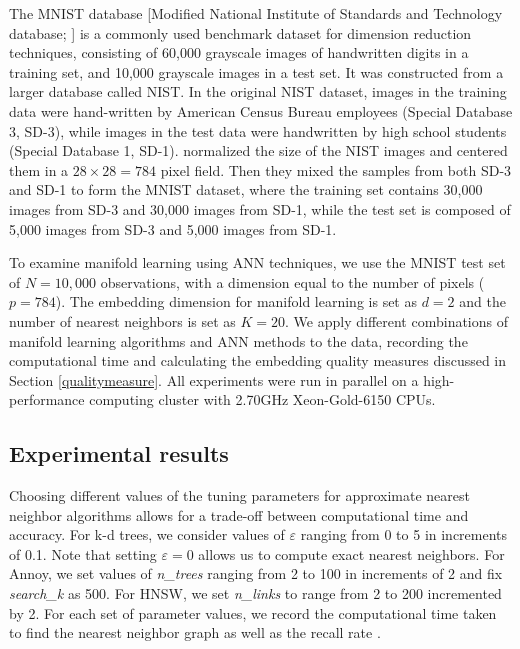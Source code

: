 \documentclass[11pt,a4paper,]{article}
\begin{document}
The MNIST database {[}Modified National Institute of Standards and Technology database; \textcite{lecun2010mnist}{]} is a commonly used benchmark dataset for dimension reduction techniques, consisting of 60,000 grayscale images of handwritten digits in a training set, and 10,000 grayscale images in a test set. It was constructed from a larger database called NIST. In the original NIST dataset, images in the training data were hand-written by American Census Bureau employees (Special Database 3, SD-3), while images in the test data were handwritten by high school students (Special Database 1, SD-1). \textcite{lecun2010mnist} normalized the size of the NIST images and centered them in a \(28\times 28=784\) pixel field. Then they mixed the samples from both SD-3 and SD-1 to form the MNIST dataset, where the training set contains 30,000 images from SD-3 and 30,000 images from SD-1, while the test set is composed of 5,000 images from SD-3 and 5,000 images from SD-1.

To examine manifold learning using ANN techniques, we use the MNIST test set of \(N=10,000\) observations, with a dimension equal to the number of pixels (\(p=784\)). The embedding dimension for manifold learning is set as \(d=2\) and the number of nearest neighbors is set as \(K=20\). We apply different combinations of manifold learning algorithms and ANN methods to the data, recording the computational time and calculating the embedding quality measures discussed in Section \ref{qualitymeasure}. All experiments were run in parallel on a high-performance computing cluster with 2.70GHz Xeon-Gold-6150 CPUs.

\hypertarget{mnistresults}{%
\subsection{Experimental results}\label{mnistresults}}

Choosing different values of the tuning parameters for approximate nearest neighbor algorithms allows for a trade-off between computational time and accuracy. For k-d trees, we consider values of \(\varepsilon\) ranging from 0 to 5 in increments of 0.1. Note that setting \(\varepsilon=0\) allows us to compute exact nearest neighbors. For Annoy, we set values of \textit{n\_trees} ranging from 2 to 100 in increments of 2 and fix \textit{search\_k} as 500. For HNSW, we set \textit{n\_links} to range from 2 to 200 incremented by 2. For each set of parameter values, we record the computational time taken to find the nearest neighbor graph as well as the recall rate .
\end{document}
